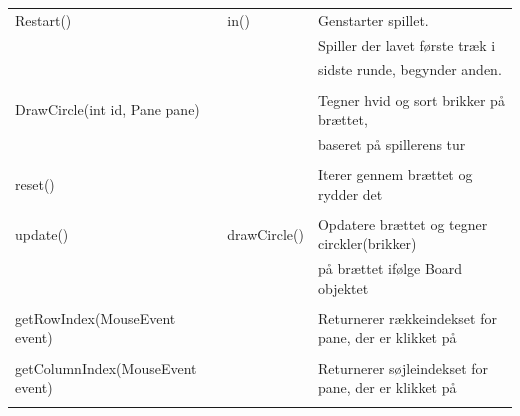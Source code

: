 \begin{table}[H]
\begin{tabular}{lll}
                            Restart() & in() & Genstarter spillet. \\
                         &         &        Spiller der lavet første træk i \\      &         & sidste runde, begynder anden.\\
                         \\
                         DrawCircle(int id, Pane pane) & & Tegner hvid og sort brikker på brættet, \\
                         & & baseret på spillerens tur
                         \\
                         \\
                          reset()                              &                 & Iterer gennem brættet og rydder det                       \\
                                             &                 &                                                           \\
        update()                             & drawCircle()    & Opdatere brættet og tegner circkler(brikker)              \\
                                             &                 & på brættet ifølge Board objektet                          \\
                                             \\
         getRowIndex(MouseEvent event)        &                 & Returnerer rækkeindekset for pane, der er klikket på      \\
                                             &                 &                                                           \\
        getColumnIndex(MouseEvent event)     &                 & Returnerer søjleindekset for pane, der er klikket på      \\
                                             &                 &                                                           \\
 \bottomrule
    \end{tabular}
\end{table}

